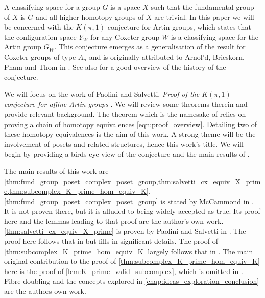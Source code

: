 % 

A classifying space for a group $G$ is a space $X$ such that the fundamental group of $X$ is $G$ and all higher homotopy groups of $X$ are trivial.
In this paper we will be concerned with the $K(\pi,1)$ conjecture for Artin groups, which states that the configuration space $Y_W$ for any Coxeter group $W$ is a classifying space for the Artin group $G_W$.  This conjecture emerges as a generalisation of the result for Coxeter groups of type $A_n$ and is originally attributed to Arnol'd, Brieskorn, Pham and Thom in \cite{paris_kpi1_2014}. See also \cite{charney_davis_pi_1995} for a good overview of the history of the conjecture.

We will focus on the work of Paolini and Salvetti, \emph{Proof of the $K(\pi, 1)$ conjecture for affine Artin groups} \cite{paolini_salvetti_kpi1_2021}. We will review some theorems therein and provide relevant background. The theorem which is the namesake of \cite{paolini_salvetti_kpi1_2021} relies on proving a chain of homotopy equivalences \eqref{eqn:proof_overview}. Detailing two of these homotopy equivalences is the aim of this work. A strong theme will be the involvement of posets and related structures, hence this work's title. We will begin by providing a birds eye view of the conjecture and the  main results of \cite{paolini_salvetti_kpi1_2021}.

The main results of this work are \cref{thm:fund_group_poset_complex_poset_group,thm:salvetti_cx_equiv_X_prime,thm:subcomplex_K_prime_hom_equiv_K}.
\cref{thm:fund_group_poset_complex_poset_group} is stated by McCammond in \cite{mccammond_introduction_2005}. It is not proven there, but it is alluded to being widely accepted as true. Its proof here and the lemmas leading to that proof are the author's own work.
\cref{thm:salvetti_cx_equiv_X_prime} is proven by Paolini and Salvetti in \cite{paolini_salvetti_kpi1_2021}. The proof here follows that in \cite{paolini_salvetti_kpi1_2021} but fills in significant details.
The proof of \cref{thm:subcomplex_K_prime_hom_equiv_K} largely follows that in \cite{paolini_salvetti_kpi1_2021}. The main original contribution to the proof of \cref{thm:subcomplex_K_prime_hom_equiv_K} here is the proof of \cref{lem:K_prime_valid_subcomplex}, which is omitted in \cite{paolini_salvetti_kpi1_2021}.
Fibre doubling and the concepts explored in \cref{chap:ideas_exploration_conclusion} are the authors own work.


% 
